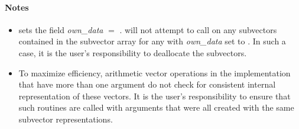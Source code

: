 \paragraph{\bf Notes}

\begin{itemize}

\item
  {\warn} sets the field {\em own\_data} $=$
  .   will not attempt to call
   on any subvectors contained in the subvector array
  for any  with {\em own\_data} set to . In
  such a case, it is the user's responsibility to deallocate the
  subvectors.

\item
  {\warn}To maximize efficiency, arithmetic vector operations in the
  {\nvecmanyvector} implementation that have more than one
   argument do not check for consistent internal
  representation of these vectors. It is the user's responsibility to
  ensure that such routines are called with  arguments
  that were all created with the same subvector representations.

\end{itemize}

